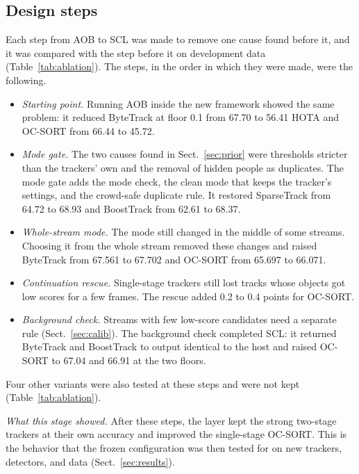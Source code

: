 \documentclass[pdflatex,sn-mathphys-num,iicol]{sn-jnl}
\newcommand{\scl}{SCL}
\newcommand{\aob}{AOB}
\begin{document}
\subsection{Design steps}\label{sec:steps}
Each step from \aob{} to \scl{} was made to remove one cause found before it,
and it was compared with the step before it on development data
(Table~\ref{tab:ablation}). The steps, in the order in which they were made,
were the following.
\begin{itemize}
\item \emph{Starting point.} Running \aob{} inside the new framework showed
      the same problem: it reduced ByteTrack at floor 0.1 from 67.70 to 56.41
      HOTA and OC-SORT from 66.44 to 45.72.
\item \emph{Mode gate.} The two causes found in Sect.~\ref{sec:prior} were
      thresholds stricter than the trackers' own and the removal of hidden
      people as duplicates. The mode gate adds the mode check, the clean mode
      that keeps the tracker's settings, and the crowd-safe duplicate rule. It
      restored SparseTrack from 64.72 to 68.93 and BoostTrack from 62.61
      to 68.37.
\item \emph{Whole-stream mode.} The mode still changed in the middle of some
      streams. Choosing it from the whole stream removed these changes and
      raised ByteTrack from 67.561 to 67.702 and OC-SORT from 65.697 to
      66.071.
\item \emph{Continuation rescue.} Single-stage trackers still lost tracks
      whose objects got low scores for a few frames. The rescue added 0.2 to
      0.4 points for OC-SORT.
\item \emph{Background check.} Streams with few low-score candidates need a
      separate rule (Sect.~\ref{sec:calib}). The background check
      completed \scl{}: it returned ByteTrack and BoostTrack to output
      identical to the host and raised OC-SORT to 67.04 and 66.91 at the two
      floors.
\end{itemize}
Four other variants were also tested at these steps and were not kept
(Table~\ref{tab:ablation}).

\emph{What this stage showed.} After these steps, the layer kept the strong
two-stage trackers at their own accuracy and improved the single-stage
OC-SORT. This is the behavior that the frozen configuration was then tested
for on new trackers, detectors, and data (Sect.~\ref{sec:results}).
\end{document}
